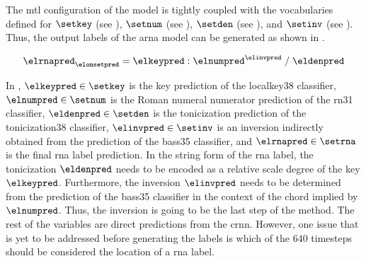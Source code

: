 
The \gls{mtl} configuration of the model is tightly coupled
with the vocabularies defined for $\setkey$ (see
), $\setnum$ (see
), $\setden$
(see ), and
$\setinv$ (see
). Thus, the
output labels of the \gls{arna} model can be generated as
shown in . 

\begin{equation}
    \label{eq:rna_pred}
    \elrnapred_{\elonsetpred} = \elkeypred : \elnumpred^{\elinvpred} \; / \; \eldenpred
\end{equation}

In , $\elkeypred \in \setkey$ is the key
prediction of the \gls{localkey38} classifier, $\elnumpred
\in \setnum$ is the Roman numeral numerator prediction of
the \gls{rn31} classifier, $\eldenpred \in \setden$ is the
tonicization prediction of the \gls{tonicization38}
classifier, $\elinvpred \in \setinv$ is an inversion
indirectly obtained from the prediction of the \gls{bass35}
classifier, and $\elrnapred \in \setrna$ is the final
\gls{rna} label prediction. In the string form of the
\gls{rna} label, the tonicization $\eldenpred$ needs to be
encoded as a relative scale degree of the key $\elkeypred$.
Furthermore, the inversion $\elinvpred$ needs to be
determined from the prediction of the \gls{bass35}
classifier in the context of the chord implied by
$\elnumpred$. Thus, the inversion is going to be the last
step of the method. The rest of the variables are direct
predictions from the \gls{crnn}. However, one issue that is
yet to be addressed before generating the labels is which of
the 640 timesteps should be considered the location of a
\gls{rna} label. 

